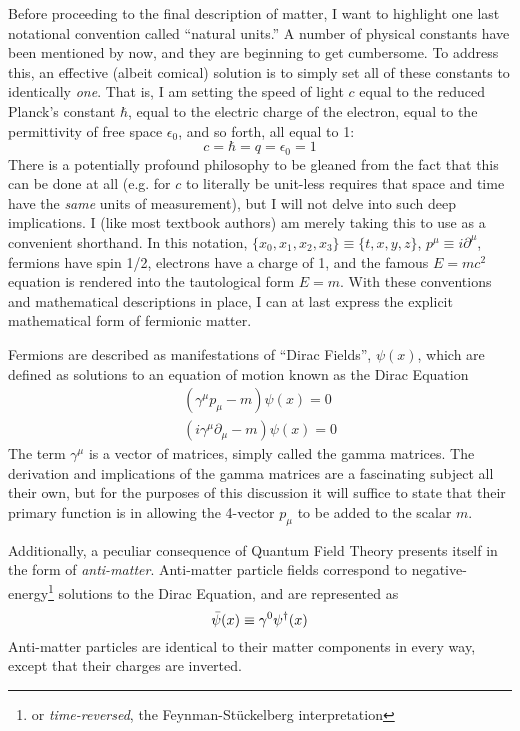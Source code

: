     Before proceeding to the final description of matter, I want to highlight one last notational convention called ``natural units.''
    A number of physical constants have been mentioned by now, and they are beginning to get cumbersome.
    To address this, an effective (albeit comical) solution is to simply set all of these constants to identically \textit{one}.
    That is, I am setting the speed of light $c$ equal to the reduced Planck's constant $\hbar$,
        equal to the electric charge of the electron, equal to the permittivity of free space $\epsilon_0$,
        and so forth, all equal to 1:
    \begin{equation} c=\hbar=q=\epsilon_0=1 \end{equation}
    There is a potentially profound philosophy to be gleaned from the fact that this can be done at all
        (e.g. for $c$ to literally be unit-less requires that space and time have the \textit{same} units of measurement),
        but I will not delve into such deep implications.
    I (like most textbook authors) am merely taking this to use as a convenient shorthand.
    In this notation, $\{x_0, x_1, x_2, x_3\} \equiv \{t,x,y,z\}$,
        $p^\mu \equiv i \partial^\mu$,
        fermions have spin 1/2,
        electrons have a charge of 1,
        and the famous $E=mc^2$ equation is rendered into the tautological form $E=m$.
    With these conventions and mathematical descriptions in place,
        I can at last express the explicit mathematical form of fermionic matter.

    Fermions are described as manifestations of ``Dirac Fields'', $\psi(x)$,
        which are defined as solutions to an equation of motion known as the Dirac Equation
    \begin{equation} \begin{split}
        (\gamma^\mu p_\mu - m) \psi(x) = 0
        \\ (i\gamma^\mu \partial_\mu - m) \psi(x) = 0
    \end{split} \end{equation}
    The term $\gamma^\mu$ is a vector of matrices, simply called the gamma matrices.
    The derivation and implications of the gamma matrices are a fascinating subject all their own, 
        but for the purposes of this discussion it will suffice to state that
        their primary function is in allowing the 4-vector $p_\mu$ to be added to the scalar $m$.

    Additionally, a peculiar consequence of Quantum Field Theory presents itself in the form of \textit{anti-matter}.
    Anti-matter particle fields correspond to negative-energy\footnote{
            or \textit{time-reversed}, the Feynman-St\"uckelberg interpretation
        } solutions to the Dirac Equation,
        and are represented as
    \begin{equation}
        \bar{\psi}(x) \equiv \gamma^0 \psi^\dag(x)
    \end{equation}
    Anti-matter particles are identical to their matter components in every way,
        except that their charges are inverted.

